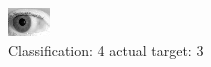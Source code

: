 \begin{figure}[h!]
\begin{center}
\includegraphics[width=0.60\columnwidth]{figures/ID233_class_4_target_3.png}
\end{center}
\caption{ Classification: 4 actual target: 3}
\label{fig:ID233_class_4_target_3}
\end{figure}
